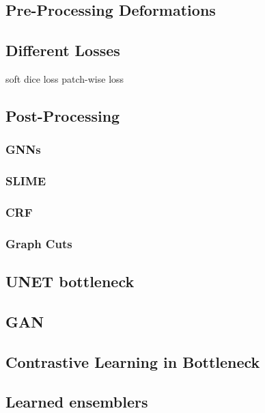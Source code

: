 \subsection{Pre-Processing Deformations}

\subsection{Different Losses}
soft dice loss
patch-wise loss
\subsection{Post-Processing}

    \subsubsection{GNNs}

    \subsubsection{SLIME}

    \subsubsection{CRF}

    \subsubsection{Graph Cuts}

\subsection{UNET bottleneck}


\subsection{GAN}


\subsection{Contrastive Learning in Bottleneck}

\subsection{Learned ensemblers}
